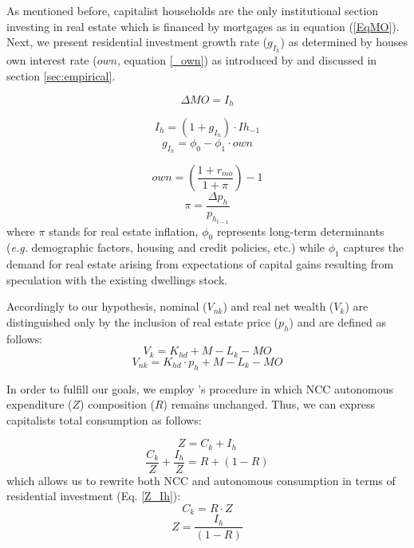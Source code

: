 \documentclass[11pt]{article}
\begin{document}
As mentioned before, capitalist households are the only institutional section investing in real estate which is financed by mortgages as in equation (\ref{EqMO}). Next, we present residential investment growth rate (\(g_{I_h}\)) as determined by houses own interest rate (\(own\), equation \ref{_own}) as introduced by \textcite{teixeira_crescimento_2015} and discussed in section \ref{sec:empirical}.


\begin{equation}
    \label{EqMO}
    \Delta MO = I_h
\end{equation}





\begin{equation}
    I_h = (1 + g_{I_h})\cdot Ih_{-1}
\end{equation}
\begin{equation}
\label{g_Z_own}
g_{I_h} = \phi_0 - \phi_1\cdot own
\end{equation}

\begin{equation}
\label{_own}
own = \left(\frac{1+r_{mo}}{1+\pi}\right) -1
\end{equation}
$$
\pi = \frac{\Delta p_h}{p_{h_{t-1}}}
$$
where \(\pi\) stands for real estate inflation, \(\phi_0\) represents long-term determinants (\emph{e.g.} demographic factors, housing and credit policies, etc.) while \(\phi_1\) captures the demand for real estate arising from expectations of capital gains resulting from speculation with the existing dwellings stock. 

Accordingly to our hypothesis, nominal (\(V_{nk}\)) and real net wealth (\(V_{k}\)) are distinguished only by the inclusion of real estate price (\(p_h\)) and are defined as follows:
\begin{equation}
V_{k} = K_{hd} + M - L_{k} - MO
\end{equation}
\begin{equation}
V_{nk} = K_{hd}\cdot p_h + M - L_{k} - MO
\end{equation}


In order to fulfill our goals, we employ \citeauthor*{freitas_baseline_2020}'s \citeyear{freitas_baseline_2020} procedure in which NCC autonomous expenditure (\(Z\)) composition (\(R\)) remains unchanged. Thus, we can express capitalists total consumption as follows:

\begin{equation}
\label{_Z}
Z = C_k + I_h
\end{equation}
$$
\frac{C_k}{Z} + \frac{I_h}{Z} = R + (1-R)
$$
which allows us to rewrite both NCC and autonomous consumption in terms of residential investment (Eq. \ref{Z_Ih}):
\begin{equation}
\label{_Ck}
    C_k = R\cdot Z
\end{equation}
\begin{equation}
\label{Z_Ih}
Z = \frac{I_h}{(1-R)}
\end{equation}
\end{document}
